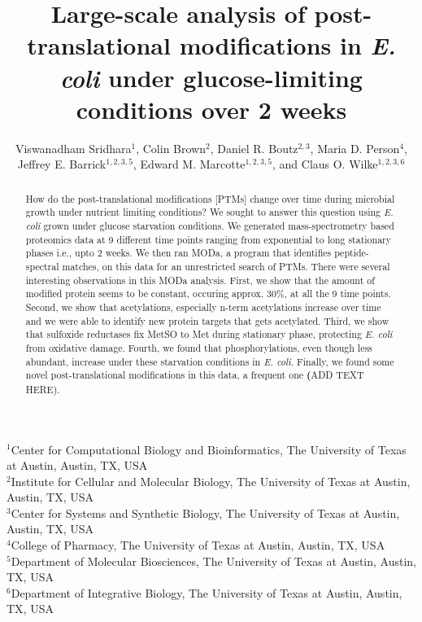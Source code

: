 \documentclass[12pt]{article}
\begin{document}
\title{Large-scale analysis of post-translational modifications in \emph{E. coli} under glucose-limiting conditions over 2 weeks}

\author{Viswanadham Sridhara$^1$, Colin Brown$^{2}$, Daniel R. Boutz$^{2,3}$, Maria D. Person$^{4}$,\\
Jeffrey E. Barrick$^{1,2,3,5}$, Edward M. Marcotte$^{1,2,3,5}$, and Claus O. Wilke$^{1,2,3,6}$}
\maketitle

\noindent
$^1$Center for Computational Biology and Bioinformatics, The University of Texas at Austin, Austin, TX, USA\\
$^2$Institute for Cellular and Molecular Biology, The University of Texas at Austin, Austin, TX, USA\\
$^3$Center for Systems and Synthetic Biology, The University of Texas at Austin, Austin, TX, USA\\
$^4$College of Pharmacy, The University of Texas at Austin, Austin, TX, USA\\
$^5$Department of Molecular Biosciences, The University of Texas at Austin, Austin, TX, USA\\
$^6$Department of Integrative Biology, The University of Texas at Austin, Austin, TX, USA\\


\begin{abstract}
How do the post-translational modifications [PTMs] change over time during microbial growth under nutrient limiting conditions? We sought to answer this question using \emph{E. coli} grown under glucose starvation conditions. We generated mass-spectrometry based proteomics data at 9 different time points ranging from exponential to long stationary phases i.e., upto 2 weeks. We then ran MODa, a program that identifies peptide-spectral matches, on this data for an unrestricted search of PTMs. There were several interesting observations in this MODa analysis. First, we show that the amount of modified protein seems to be constant, occuring approx. 30\%, at all the 9 time points. Second, we show that acetylations, especially n-term acetylations increase over time and we were able to identify new protein targets that gets acetylated. Third, we show that sulfoxide reductases fix MetSO to Met during stationary phase, protecting \emph{E. coli} from oxidative damage. Fourth, we found that phosphorylations, even though less abundant, increase under these starvation conditions in \emph{E. coli}. Finally, we found some novel post-translational modifications in this data, a frequent one \textbf(ADD TEXT HERE).
\end{abstract}
\end{document}
